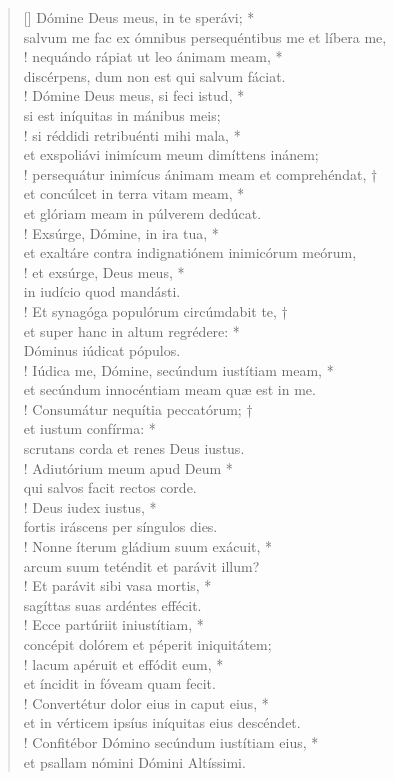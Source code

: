 \begin{verse}[\versewidth]
Dómine Deus meus, in te sperávi; *\\
salvum me fac ex ómnibus persequéntibus me et líbera me,\\!
\vin nequándo rápiat ut leo ánimam meam, *\\
\vin discérpens, dum non est qui salvum fáciat.\\!
Dómine Deus meus, si feci istud, *\\
si est iníquitas in mánibus meis;\\!
\vin si réddidi retribuénti mihi mala, *\\
\vin et exspoliávi inimícum meum dimíttens inánem;\\!
persequátur inimícus ánimam meam et comprehéndat, †\\
et concúlcet in terra vitam meam, *\\
et glóriam meam in púlverem dedúcat.\\!
\vin Exsúrge, Dómine, in ira tua, *\\
\vin et exaltáre contra indignatiónem inimicórum meórum,\\!
et exsúrge, Deus meus, *\\
in iudício quod mandásti.\\!
\vin Et synagóga populórum circúmdabit te, †\\
\vin et super hanc in altum regrédere: *\\
\vin Dóminus iúdicat pópulos.\\!
Iúdica me, Dómine, secúndum iustítiam meam, *\\
et secúndum innocéntiam meam quæ est in me.\\!
\vin Consumátur nequítia peccatórum; †\\
\vin et iustum confírma: *\\
\vin scrutans corda et renes Deus iustus.\\!
Adiutórium meum apud Deum *\\
qui salvos facit rectos corde.\\!
\vin Deus iudex iustus, *\\
\vin fortis iráscens per síngulos dies.\\!
Nonne íterum gládium suum exácuit, *\\
arcum suum teténdit et parávit illum?\\!
\vin Et parávit sibi vasa mortis, *\\
\vin sagíttas suas ardéntes effécit.\\!
Ecce partúriit iniustítiam, *\\
concépit dolórem et péperit iniquitátem;\\!
\vin lacum apéruit et effódit eum, *\\
\vin et íncidit in fóveam quam fecit.\\!
Convertétur dolor eius in caput eius, *\\
et in vérticem ipsíus iníquitas eius descéndet.\\!
\vin Confitébor Dómino secúndum iustítiam eius, *\\
\vin et psallam nómini Dómini Altíssimi.\\
\end{verse}
\vspace{1cm}


